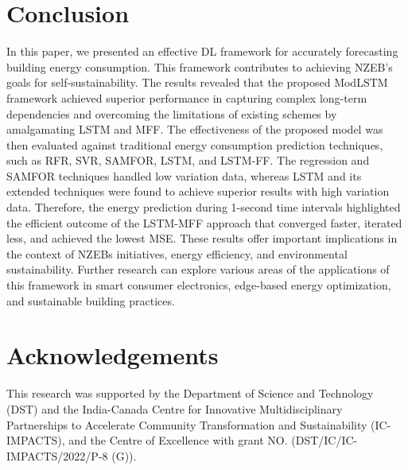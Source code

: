 \documentclass[journal]{IEEEtran}
\begin{document}
\section{Conclusion} \label{Conclusion}
In this paper, we presented an effective DL framework for accurately forecasting building energy consumption. This framework contributes to achieving NZEB's goals for self-sustainability. The results revealed that the proposed ModLSTM framework achieved superior performance in capturing complex long-term dependencies and overcoming the limitations of existing schemes by amalgamating LSTM and MFF. The effectiveness of the proposed model was then evaluated against traditional energy consumption prediction techniques, such as RFR, SVR, SAMFOR, LSTM, and LSTM-FF. The regression and SAMFOR techniques handled low variation data, whereas LSTM and its extended techniques were found to achieve superior results with high variation data. Therefore, the energy prediction during 1-second time intervals highlighted the efficient outcome of the LSTM-MFF approach that converged faster,  iterated less, and achieved the lowest MSE. These results offer important implications in the context of NZEBs initiatives, energy efficiency, and environmental sustainability. Further research can explore various areas of the applications of this framework in smart consumer electronics, edge-based energy optimization, and
sustainable building practices.  



 \section*{Acknowledgements} This research was supported by the Department of Science and Technology (DST) and the India-Canada Centre for Innovative Multidisciplinary Partnerships to Accelerate Community Transformation and Sustainability (IC-IMPACTS), and the Centre of Excellence with grant NO. (DST/IC/IC-IMPACTS/2022/P-8 (G)).
 
 
 

\ifCLASSOPTIONcaptionsoff
  \newpage
\fi
\medskip


\end{document}
